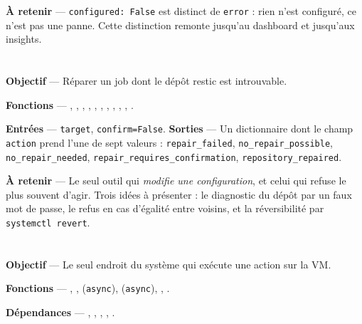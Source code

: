 \textbf{À retenir} --- \texttt{configured: False} est distinct de
\texttt{error} : rien n'est configuré, ce n'est pas une panne. Cette distinction
remonte jusqu'au dashboard et jusqu'aux insights.

\section{}

\textbf{Objectif} --- Réparer un job dont le dépôt restic est introuvable.

\textbf{Fonctions} --- , ,
, ,
, , ,
, , ,
.

\textbf{Entrées} --- \texttt{target}, \texttt{confirm=False}.
\textbf{Sorties} --- Un dictionnaire dont le champ \texttt{action} prend l'une de
sept valeurs : \texttt{repair\_failed}, \texttt{no\_repair\_possible},
\texttt{no\_repair\_needed}, \texttt{repair\_requires\_confirmation},
\texttt{repository\_repaired}.

\textbf{À retenir} --- Le seul outil qui \emph{modifie une configuration}, et
celui qui refuse le plus souvent d'agir. Trois idées à présenter : le
diagnostic du dépôt par un faux mot de passe, le refus en cas d'égalité entre
voisins, et la réversibilité par \texttt{systemctl revert}.

\section{}

\textbf{Objectif} --- Le seul endroit du système qui exécute une action sur la
VM.

\textbf{Fonctions} --- , ,
 (\texttt{async}), 
(\texttt{async}), , .

\textbf{Dépendances} --- ,
, ,
, .

